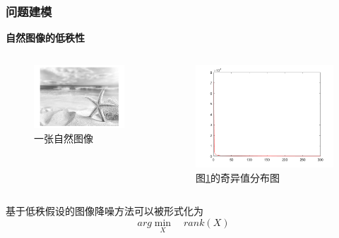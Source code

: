 \documentclass[10pt,aspectratio=43,mathserif]{beamer}
\begin{document}
\begin{frame}
\frametitle{\textbf{问题建模}}
\begin{block}{\textbf{自然图像的低秩性}}
\begin{columns}
\begin{figure}[!t]
\centering
\includegraphics[scale=0.3]{example-figure.png}
\caption{一张自然图像}
\label{example-figure}
\end{figure}

\begin{figure}[!t]
\centering
\includegraphics[scale=0.2]{example-figure-svd.png}
\caption{图\ref{example-figure}的奇异值分布图}
\label{example-figure-svd}
\end{figure}
\end{columns}
\end{block}
\par 基于低秩假设的图像降噪方法可以被形式化为
\begin{displaymath}
arg\min\limits_{X} \quad rank(X)
\end{displaymath}
\end{frame}
\end{document}
